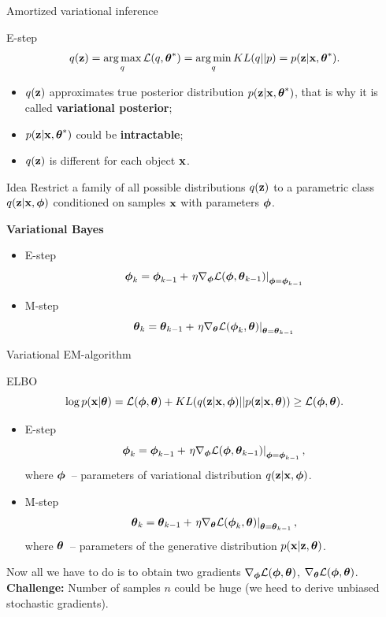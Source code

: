 \begin{frame}{Amortized variational inference}
    \begin{block}{E-step}
	    \vspace{-0.3cm}
	    \[
			q(\mathbf{z}) = \operatorname*{arg\,max}_q \mathcal{L} (q, \boldsymbol{\theta}^*) = \operatorname*{arg\,min}_q KL(q || p) =
			 p(\mathbf{z}| \mathbf{x}, \boldsymbol{\theta}^*).
		\]
		\vspace{-0.3cm}
		\begin{itemize}
			\item $q(\mathbf{z})$ approximates true posterior distribution $p(\mathbf{z}| \mathbf{x}, \boldsymbol{\theta}^*)$, that is why it is called \textbf{variational posterior};
			\item $p(\mathbf{z}| \mathbf{x}, \boldsymbol{\theta}^*)$ could be \textbf{intractable};
			\item $q(\mathbf{z})$ is different for each object $\mathbf{x}$.
		\end{itemize}
		\vspace{-0.3cm}
    \end{block}
	\begin{block}{Idea}
	Restrict a family of all possible distributions $q(\mathbf{z})$ to a parametric class $q(\mathbf{z}|\mathbf{x}, \boldsymbol{\phi})$ conditioned on samples $\mathbf{x}$ with parameters $\boldsymbol{\phi}$.
	\end{block}
	
	\textbf{Variational Bayes}
	\begin{itemize}
		\item E-step
		\[
		\boldsymbol{\phi}_k = \boldsymbol{\phi}_{k-1} + \left.\eta \nabla_{\boldsymbol{\phi}} \mathcal{L}(\boldsymbol{\phi}, \boldsymbol{\theta}_{k-1})\right|_{\boldsymbol{\phi}=\boldsymbol{\phi}_{k-1}}
		\]
		\item M-step
		\[
		\boldsymbol{\theta}_k = \boldsymbol{\theta}_{k-1} + \left.\eta \nabla_{\boldsymbol{\theta}} \mathcal{L}(\boldsymbol{\phi}_k, \boldsymbol{\theta})\right|_{\boldsymbol{\theta}=\boldsymbol{\theta}_{k-1}}
		\]
	\end{itemize}
\end{frame}
\begin{frame}{Variational EM-algorithm}
	\begin{block}{ELBO}
		\vspace{-0.5cm}
		\[
			\log p(\mathbf{x}| \boldsymbol{\theta}) = \mathcal{L} (\boldsymbol{\phi}, \boldsymbol{\theta}) + KL(q(\mathbf{z} | \mathbf{x}, \boldsymbol{\phi}) || p(\mathbf{z}|\mathbf{x}, \boldsymbol{\theta})) \geq \mathcal{L} (\boldsymbol{\phi}, \boldsymbol{\theta}).
		\]
		\vspace{-0.5cm}
	\end{block}
	\begin{itemize}
		\item E-step
		\[
		\boldsymbol{\phi}_k = \boldsymbol{\phi}_{k-1} + \left.\eta \nabla_{\boldsymbol{\phi}} \mathcal{L}(\boldsymbol{\phi}, \boldsymbol{\theta}_{k-1})\right|_{\boldsymbol{\phi}=\boldsymbol{\phi}_{k-1}},
		\]
		where $\boldsymbol{\phi}$~-- parameters of variational distribution $q(\mathbf{z} | \mathbf{x}, \boldsymbol{\phi})$.
		\item M-step
		\[
		\boldsymbol{\theta}_k = \boldsymbol{\theta}_{k-1} + \left.\eta \nabla_{\boldsymbol{\theta}} \mathcal{L}(\boldsymbol{\phi}_k, \boldsymbol{\theta})\right|_{\boldsymbol{\theta}=\boldsymbol{\theta}_{k-1}},
		\]
		where $\boldsymbol{\theta}$~-- parameters of the generative distribution $p(\mathbf{x} | \mathbf{z}, \boldsymbol{\theta})$.
	\end{itemize}
	Now all we have to do is to obtain two gradients $\nabla_{\boldsymbol{\phi}} \mathcal{L}(\boldsymbol{\phi}, \boldsymbol{\theta})$, $\nabla_{\boldsymbol{\theta}} \mathcal{L}(\boldsymbol{\phi}, \boldsymbol{\theta})$.  \\
	\textbf{Challenge:} Number of samples $n$ could be huge (we heed to derive unbiased stochastic gradients).
\end{frame}
